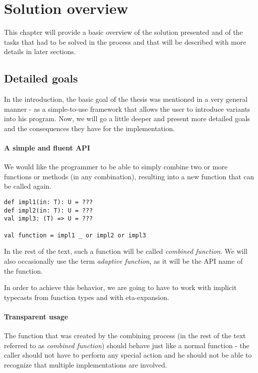 \chapter{Solution overview}

This chapter will provide a basic overview of the solution presented and of the tasks that had to be solved in the process and that will be described with more details in later sections.


\section{Detailed goals}
\label{sec:goals_revisited}

In the introduction, the basic goal of the thesis was mentioned in a very general manner - as a simple-to-use framework that allows the user to introduce variants into his program. Now, we will go a little deeper and present more detailed goals and the consequences they have for the implementation.

\subsubsection{A simple and fluent API}

We would like the programmer to be able to simply combine two or more functions or methods (in any combination), resulting into a new function that can be called again.

\lstset{style=Scala}
\begin{lstlisting}
def impl1(in: T): U = ???
def impl2(in: T): U = ???
val impl3: (T) => U = ???

val function = impl1 _ or impl2 or impl3
\end{lstlisting}

In the rest of the text, such a function will be called \textit{combined function}. We will also occasionally use the term \textit{adaptive function}, as it will be the API name of the function.

In order to achieve this behavior, we are going to have to work with implicit typecasts from function types and with eta-expansion.

\subsubsection{Transparent usage}

The function that was created by the combining process (in the rest of the text referred to as \textit{combined function}) should behave just like a normal function - the caller should not have to perform any special action and he should not be able to recognize that multiple implementations are involved.

